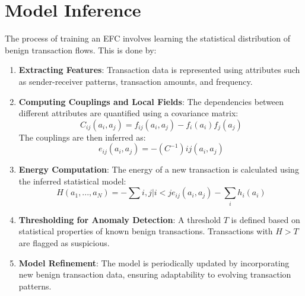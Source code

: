 \section{Model Inference}
The process of training an EFC involves learning the statistical distribution of
benign transaction flows. This is done by:

\begin{enumerate}
    \item \textbf{Extracting Features}: Transaction data is represented using
    attributes such as sender-receiver patterns, transaction amounts, and frequency.
    \item \textbf{Computing Couplings and Local Fields}: The dependencies between
    different attributes are quantified using a covariance matrix:
    \begin{equation}
        C_{ij}(a_i, a_j) = f_{ij}(a_i, a_j) - f_i(a_i) f_j(a_j)
    \end{equation}
    The couplings are then inferred as:
    \begin{equation}
        e_{ij}(a_i, a_j) = - (C^{-1}){ij}(a_i, a_j)
    \end{equation}
    \item \textbf{Energy Computation}: The energy of a new transaction is calculated
        using the inferred statistical model:
    \begin{equation}
        H(a_1, ..., a_N) = - \sum{i,j | i<j} e_{ij}(a_i, a_j) - \sum_i h_i(a_i)
    \end{equation}
    \item \textbf{Thresholding for Anomaly Detection}: A threshold $ T $ is defined
        based on statistical properties of known benign transactions. Transactions
        with $ H > T $ are flagged as suspicious.
    \item \textbf{Model Refinement}: The model is periodically updated by incorporating
        new benign transaction data, ensuring adaptability to evolving transaction
        patterns.
\end{enumerate}
